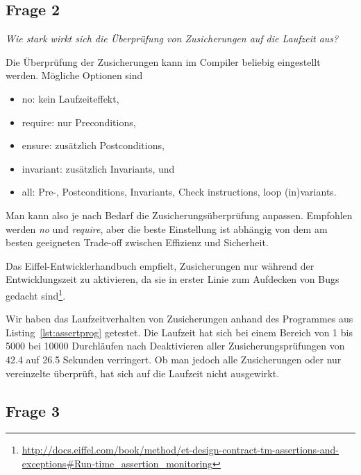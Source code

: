 \documentclass[a4paper,10pt]{article}
\begin{document}

\subsection{Frage 2}

\emph{Wie stark wirkt sich die Überprüfung von Zusicherungen auf die Laufzeit aus?}

\vspace{3mm}

Die \"Uberpr\"ufung der Zusicherungen kann im Compiler beliebig eingestellt werden. M\"ogliche Optionen sind

\begin{itemize}
\item no: kein Laufzeiteffekt,
\item require: nur Preconditions,
\item ensure: zus\"atzlich Postconditions,
\item invariant: zus\"atzlich Invariants, und
\item all: Pre-, Postconditions, Invariants, Check instructions, loop (in)variants.
\end{itemize}

Man kann also je nach Bedarf die Zusicherungs\"uberpr\"ufung anpassen. Empfohlen werden
\emph{no} und \emph{require}, aber die beste Einstellung ist abh\"angig von dem am besten
geeigneten Trade-off zwischen Effizienz und Sicherheit.

Das Eiffel-Entwicklerhandbuch empfielt, Zusicherungen nur während der Entwicklungszeit zu aktivieren, da sie in erster Linie zum Aufdecken von Bugs gedacht sind\footnote{\url{http://docs.eiffel.com/book/method/et-design-contract-tm-assertions-and-exceptions\#Run-time_assertion_monitoring}}. 

Wir haben das Laufzeitverhalten von Zusicherungen anhand des Programmes aus Listing~\ref{lst:assertprog} getestet. Die Laufzeit hat sich bei einem Bereich von 1 bis 5000 bei 10000 Durchläufen nach Deaktivieren aller Zusicherungsprüfungen von 42.4 auf 26.5 Sekunden verringert. Ob man jedoch alle Zusicherungen oder nur vereinzelte überprüft, hat sich auf die Laufzeit nicht ausgewirkt.


\subsection{Frage 3}
\end{document}
